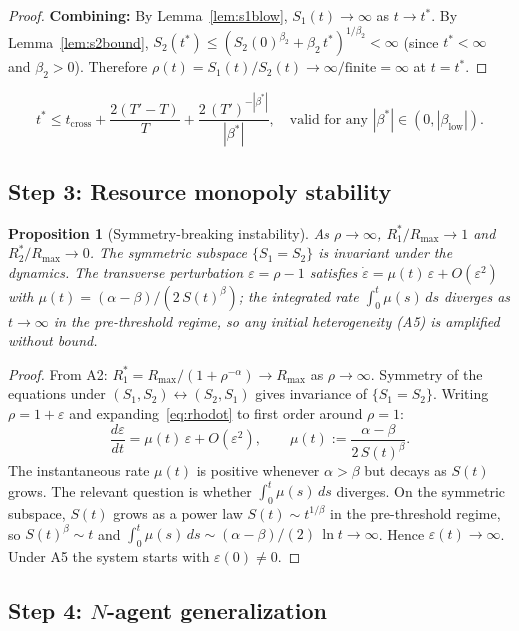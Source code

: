 \documentclass[11pt,letterpaper]{article}
\theoremstyle{plain}
\newtheorem{proposition}[theorem]{Proposition}
\theoremstyle{definition}
\theoremstyle{remark}
\newcommand{\Rmax}{R_{\max}}
\newcommand{\betaL}{\beta_{\mathrm{low}}}
\newcommand{\tcross}{t_{\mathrm{cross}}}
\newcommand{\tstar}{t^{*}}
\begin{document}
\begin{proof}
\textbf{Combining:}
By Lemma~\ref{lem:s1blow}, $S_1(t) \to \infty$ as $t \to \tstar$.
By Lemma~\ref{lem:s2bound}, $S_2(\tstar) \leq
(S_2(0)^{\beta_2} + \beta_2\,\tstar)^{1/\beta_2} < \infty$
(since $\tstar < \infty$ and $\beta_2 > 0$).
Therefore $\rho(t) = S_1(t)/S_2(t) \to \infty/\text{finite} = \infty$ at $t = \tstar$.
\end{proof}

\[
  \tstar \leq \tcross + \frac{2(T'-T)}{T}
             + \frac{2\,(T')^{-|\beta^*|}}{|\beta^*|},
  \quad \text{valid for any } |\beta^*| \in (0, |\betaL|).
\]

\subsection{Step 3: Resource monopoly stability}
\label{sec:step3}

\begin{proposition}[Symmetry-breaking instability]
\label{prop:monopoly}
As $\rho \to \infty$, $R_1^*/\Rmax \to 1$ and $R_2^*/\Rmax \to 0$.
The symmetric subspace $\{S_1 = S_2\}$ is invariant under the dynamics.
The transverse perturbation $\varepsilon = \rho - 1$ satisfies
$\dot{\varepsilon} = \mu(t)\,\varepsilon + O(\varepsilon^2)$ with
$\mu(t) = (\alpha - \beta)/(2\,S(t)^{\beta})$;
the integrated rate $\int_0^t \mu(s)\,ds$ diverges as $t \to \infty$
in the pre-threshold regime, so any initial heterogeneity (A5) is amplified
without bound.
\end{proposition}

\begin{proof}
From A2: $R_1^* = \Rmax/(1 + \rho^{-\alpha}) \to \Rmax$ as $\rho \to \infty$.
Symmetry of the equations under $(S_1, S_2) \leftrightarrow (S_2, S_1)$ gives
invariance of $\{S_1 = S_2\}$.
Writing $\rho = 1 + \varepsilon$ and expanding~\eqref{eq:rhodot} to first order
around $\rho = 1$:
\[
  \frac{d\varepsilon}{dt}
  = \mu(t)\,\varepsilon + O(\varepsilon^2),
  \qquad
  \mu(t) := \frac{\alpha - \beta}{2\,S(t)^{\beta}}.
\]
The instantaneous rate $\mu(t)$ is positive whenever $\alpha > \beta$
but decays as $S(t)$ grows.
The relevant question is whether $\int_0^t \mu(s)\,ds$ diverges.
On the symmetric subspace, $S(t)$ grows as a power law $S(t) \sim t^{1/\beta}$
in the pre-threshold regime, so $S(t)^\beta \sim t$ and
$\int_0^t \mu(s)\,ds \sim (\alpha-\beta)/(2)\,\ln t \to \infty$.
Hence $\varepsilon(t) \to \infty$.
Under A5 the system starts with $\varepsilon(0) \neq 0$.
\end{proof}

\subsection{Step 4: $N$-agent generalization}
\label{sec:step4}
\end{document}
